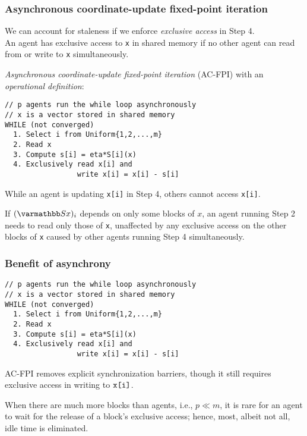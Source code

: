 \documentclass[10pt,mathserif]{beamer}
\begin{document}
\begin{frame}
\frametitle{Asynchronous coordinate-update fixed-point iteration}

We can account for staleness if we enforce \emph{exclusive access} in Step 4.\\
An agent has exclusive access to \verb|x| in shared memory if no other agent can read from or write to \verb|x| simultaneously.




\vspace{0.1in}
\emph{Asynchronous coordinate-update fixed-point iteration} (AC-FPI) with an \emph{operational definition}:
\begin{lstlisting}
// p agents run the while loop asynchronously
// x is a vector stored in shared memory
WHILE (not converged)
  1. Select i from Uniform{1,2,...,m}
  2. Read x
  3. Compute s[i] = eta*S[i](x)
  4. Exclusively read x[i] and
                 write x[i] = x[i] - s[i]
\end{lstlisting}
While an agent is updating \verb|x[i]| in Step 4, others cannot access \verb|x[i]|.
\vspace{0.1in}

If $(\opS x)_i$ depends on only some blocks of $x$, an agent running Step 2 needs to read only those of \verb|x|, unaffected by any exclusive access on the other blocks of \verb|x| caused by other agents running Step 4 simultaneously.
\end{frame}


\begin{frame}[fragile]
\frametitle{Benefit of asynchrony}
\begin{lstlisting}
// p agents run the while loop asynchronously
// x is a vector stored in shared memory
WHILE (not converged)
  1. Select i from Uniform{1,2,...,m}
  2. Read x
  3. Compute s[i] = eta*S[i](x)
  4. Exclusively read x[i] and
                 write x[i] = x[i] - s[i]
\end{lstlisting}
AC-FPI removes explicit synchronization barriers, though it still requires exclusive access in writing to $\verb|x[i]|$.




\vspace{0.1in}

When there are much more blocks than agents, i.e., $p\ll m$, it is rare for an agent to wait for the release of a block's exclusive access; hence, most, albeit not all, idle time is eliminated.
\end{frame}
\end{document}
